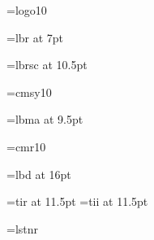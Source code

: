 \typesize=12pt

\noheaders	%

\vsize=5in	%



\font\logo=logo10	%

\font\smallrm=lbr at 7pt	%

\font\sc=lbrsc at 10.5pt	%

\font\calsy=cmsy10		%

\font\lbma=lbma at 9.5pt

\font\cmr=cmr10			%

\font\bfhead=lbd at 16pt	%

\font\tir=tir at 11.5pt
\font\tii=tii at 11.5pt

\font\lstnr=lstnr

\def\MathTime{{\tii MathT\kern-1.5pt\i me}}

\let\menu=\it			%


\def\green{0 0.5 0}
\def\blue{0 0 1}
\def\colorpush#1{\special{color push rgb #1}}
\def\colorpop{\special{color pop}}
\def\hb#1{\colorpush\blue{#1}\colorpop}
\def\hg#1{\colorpush\green{#1}\colorpop}

%
%
\newcount\height
\newcount\width
%
\def\ref#1#2{\leavevmode
   \setbox0=\hbox{\hg{#1}}\height=\ht0\width=\wd0%
   \special{button: \the\width\space \the\height\space <#2>}%
   \unhbox0}
\def\xref#1{\leavevmode\special{mark: \space <#1>}}
\def\launch#1#2{\leavevmode
   \setbox0=\hbox{\hg{#1}}\height=\ht0\width=\wd0%
   \special{button: \the\width\space \the\height\space launch: #2}%
   \unhbox0}
\def\http#1{\leavevmode
   \setbox0=\hbox{\hg{#1}}\height=\ht0\width=\wd0%
   \special{button: \the\width\space \the\height\space #1}%
   \unhbox0}
\def\httpx#1#2{\leavevmode
   \setbox0=\hbox{\hg{#1}}\height=\ht0\width=\wd0%
   \special{button: \the\width\space \the\height\space #2}%
   \unhbox0}

